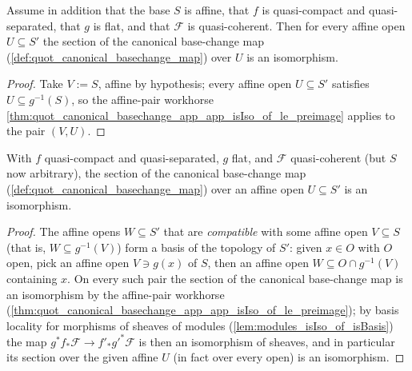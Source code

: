\begin{theorem}\leanok
  \label{thm:quot_canonical_basechange_app_app_isIso_of_isAffineBase}
  Assume in addition that the base \(S\) is affine, that \(f\) is
  quasi-compact and quasi-separated, that \(g\) is flat, and that
  \(\mathcal{F}\) is quasi-coherent. Then for every affine open
  \(U \subseteq S'\) the section of the canonical base-change map
  (\cref{def:quot_canonical_basechange_map}) over \(U\) is an isomorphism.
\end{theorem}
\begin{proof}\leanok
  Take \(V := S\), affine by hypothesis; every affine open
  \(U \subseteq S'\) satisfies \(U \subseteq g^{-1}(S)\), so the affine-pair
  workhorse
  \cref{thm:quot_canonical_basechange_app_app_isIso_of_le_preimage}
  applies to the pair \((V, U)\).
\end{proof}

\begin{theorem}\leanok
  \label{thm:quot_canonical_basechange_app_app_isIso_of_isAffineOpen}
  With \(f\) quasi-compact and quasi-separated, \(g\) flat, and
  \(\mathcal{F}\) quasi-coherent (but \(S\) now arbitrary), the section of
  the canonical base-change map (\cref{def:quot_canonical_basechange_map})
  over an affine open \(U \subseteq S'\) is an isomorphism.
\end{theorem}
\begin{proof}\leanok
  The affine opens \(W \subseteq S'\) that are \emph{compatible} with some
  affine open \(V \subseteq S\) (that is, \(W \subseteq g^{-1}(V)\)) form a
  basis of the topology of \(S'\): given \(x \in O\) with \(O\) open, pick
  an affine open \(V \ni g(x)\) of \(S\), then an affine open
  \(W \subseteq O \cap g^{-1}(V)\) containing \(x\). On every such pair the
  section of the canonical base-change map is an isomorphism by the
  affine-pair workhorse
  (\cref{thm:quot_canonical_basechange_app_app_isIso_of_le_preimage}); by
  basis locality for morphisms of sheaves of modules
  (\cref{lem:modules_isIso_of_isBasis}) the map
  \(g^* f_* \mathcal F \to f'_* g'^* \mathcal F\) is then an isomorphism of
  sheaves, and in particular its section over the given affine \(U\) (in
  fact over every open) is an isomorphism.
\end{proof}

